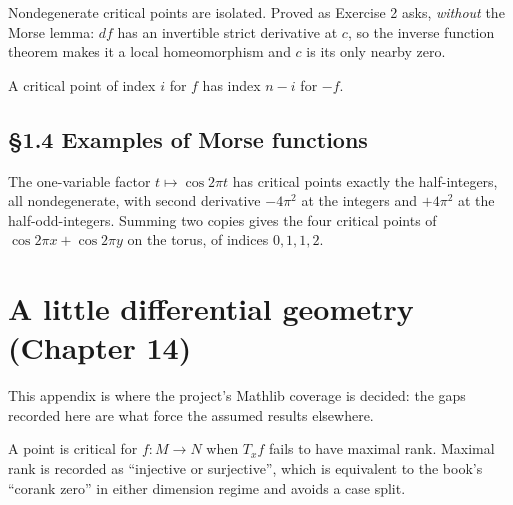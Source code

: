 \begin{corollary}[Corollary 1.3.2]
  \label{cor:1.3.2}
  \leanok
  Nondegenerate critical points are isolated.  Proved as Exercise 2 asks,
  \emph{without} the Morse lemma: $df$ has an invertible strict derivative at
  $c$, so the inverse function theorem makes it a local homeomorphism and $c$ is
  its only nearby zero.
\end{corollary}

\begin{proposition}[Remark 1.3.3]
  \label{prop:1.3.3}
  \leanok
  A critical point of index $i$ for $f$ has index $n-i$ for $-f$.
\end{proposition}

\section{\S1.4 Examples of Morse functions}

\begin{proposition}
  \label{prop:1.4.c}
  \leanok
  The one-variable factor $t \mapsto \cos 2\pi t$ has critical points exactly the
  half-integers, all nondegenerate, with second derivative $-4\pi^2$ at the
  integers and $+4\pi^2$ at the half-odd-integers.  Summing two copies gives the
  four critical points of $\cos 2\pi x + \cos 2\pi y$ on the torus, of indices
  $0, 1, 1, 2$.
\end{proposition}

\chapter{A little differential geometry (Chapter 14)}

This appendix is where the project's Mathlib coverage is decided: the gaps
recorded here are what force the assumed results elsewhere.

\begin{definition}
  \label{def:14.2.a}
  \leanok
  A point is critical for $f\colon M\to N$ when $T_xf$ fails to have maximal
  rank.  Maximal rank is recorded as ``injective or surjective'', which is
  equivalent to the book's ``corank zero'' in either dimension regime and avoids
  a case split.
\end{definition}

